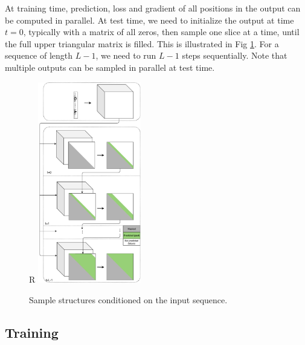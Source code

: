 \documentclass{article}
\begin{document}
At training time, prediction, loss and gradient of all positions in the output can be computed in parallel.
At test time, we need to initialize the output at time $t=0$, typically with a matrix of all zeros,
then sample one slice at a time, until the full upper triangular matrix is filled.
This is illustrated in Fig \ref{fig:nn_arch_2}.
For a sequence of length $L-1$, we need to run $L-1$ steps sequentially.
Note that multiple outputs can be sampled in parallel at test time.


%

\begin{figure}{R}
        \centering
        \includegraphics[width=0.4\textwidth]{plot/nn_arch_2.pdf}
        \caption{Sample structures conditioned on the input sequence.}
        \label{fig:nn_arch_2}
        \centering
\end{figure}




\subsection{Training}
\end{document}
